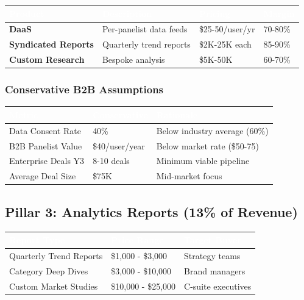 \documentclass[11pt,a4paper]{article}
\begin{document}
\begin{center}
\begin{tabular}{L{3.5cm} L{4cm} R{2.5cm} R{2cm}}
    \toprule
    \textcolor{white}{\textbf{Product}} & \textcolor{white}{\textbf{Description}} & \textcolor{white}{\textbf{Pricing}} & \textcolor{white}{\textbf{Margin}}\\
    \midrule
    \textbf{DaaS} & Per-panelist data feeds & \$25-50/user/yr & 70-80\%\\
    \textbf{Syndicated Reports} & Quarterly trend reports & \$2K-25K each & 85-90\%\\
    \textbf{Custom Research} & Bespoke analysis & \$5K-50K & 60-70\%\\
    \bottomrule
\end{tabular}
\end{center}

\subsubsection{Conservative B2B Assumptions}

\begin{center}
\begin{tabular}{L{4cm} L{3cm} L{5cm}}
    \toprule
    \textcolor{white}{\textbf{Metric}} & \textcolor{white}{\textbf{Conservative}} & \textcolor{white}{\textbf{Rationale}}\\
    \midrule
    Data Consent Rate & 40\% & Below industry average (60\%)\\
    B2B Panelist Value & \$40/user/year & Below market rate (\$50-75)\\
    Enterprise Deals Y3 & 8-10 deals & Minimum viable pipeline\\
    Average Deal Size & \$75K & Mid-market focus\\
    \bottomrule
\end{tabular}
\end{center}

\subsection{Pillar 3: Analytics Reports (13\% of Revenue)}

\begin{center}
\begin{tabular}{L{4cm} R{3.5cm} L{4cm}}
    \toprule
    \textcolor{white}{\textbf{Report Type}} & \textcolor{white}{\textbf{Price Range}} & \textcolor{white}{\textbf{Target Buyer}}\\
    \midrule
    Quarterly Trend Reports & \$1,000 - \$3,000 & Strategy teams\\
    Category Deep Dives & \$3,000 - \$10,000 & Brand managers\\
    Custom Market Studies & \$10,000 - \$25,000 & C-suite executives\\
    \bottomrule
\end{tabular}
\end{center}
\end{document}
